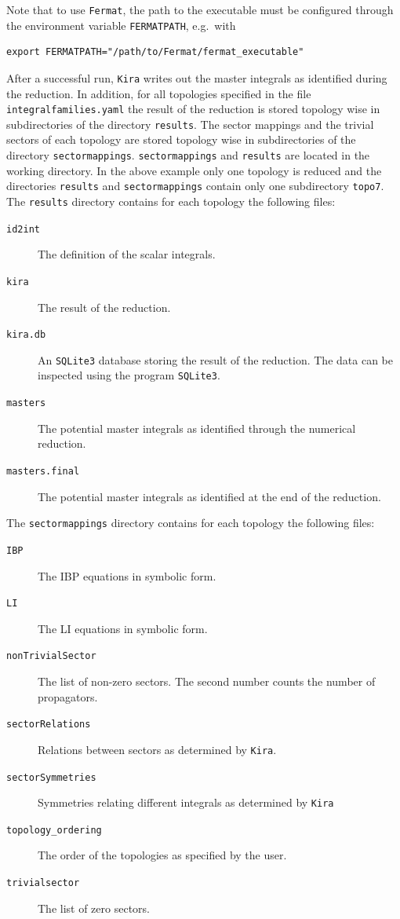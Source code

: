 \documentclass[a4paper,12pt]{scrartcl}
\newcommand*{\kira}{\texttt{Kira}}
\newcommand*{\fermat}{\texttt{Fermat}}
\newcommand*{\sqlite}{\texttt{SQLite3}}
\begin{document}
Note that to use \fermat{}, the path to the executable must be configured
through the environment variable \texttt{FERMATPATH}, e.g.\ with
\begin{verbatim}
export FERMATPATH="/path/to/Fermat/fermat_executable"
\end{verbatim}
After a successful run, \kira{} writes out the master integrals as
identified during the reduction. In addition, for all topologies
specified in the file \texttt{integralfamilies.yaml} the result of the
reduction is stored topology wise in subdirectories of the directory
\texttt{results}. The sector mappings and the trivial sectors of each topology
are stored topology wise in subdirectories of the directory
\texttt{sectormappings}. \texttt{sectormappings} and \texttt{results} are
located in the working directory.  In the above
example only one topology is reduced and the directories \texttt{results} and
\texttt{sectormappings} contain only one subdirectory \texttt{topo7}.
The \texttt{results} directory contains for each topology the following files:
\begin{description}
\item[\texttt{id2int}] The definition of the scalar integrals.
\item[\texttt{kira}] The result of the reduction.
\item[\texttt{kira.db}] An \sqlite{} database storing the result of
  the reduction. The data can be inspected using the program \sqlite{}.
\item[\texttt{masters}] The potential master integrals as identified
  through the numerical reduction.
\item[\texttt{masters.final}] The potential master integrals as identified
  at the end of the reduction.
\end{description}
The \texttt{sectormappings} directory contains for each topology the following
files:
\begin{description}
\item[\texttt{IBP}] The IBP equations in symbolic form.
\item[\texttt{LI}] The LI equations in symbolic form.
\item[\texttt{nonTrivialSector}] The list of non-zero sectors. The
  second number counts the number of propagators.
\item[\texttt{sectorRelations}] Relations between sectors as
  determined by \kira{}.
\item[\texttt{sectorSymmetries}] Symmetries relating different
  integrals as determined by \kira{}
\item[\texttt{topology\_ordering}] The order of the topologies as
  specified by the user.
\item[\texttt{trivialsector}] The list of zero sectors.
\end{description}
\end{document}

